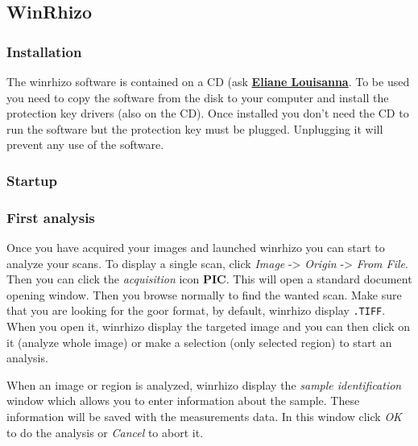 \documentclass[
  12pt,
  american,
  a4paper,
  extrafontsizes,onecolumn,openright
  ]{memoir}
\begin{document}
\normalsize

\hypertarget{winrhizo}{%
\subsection{WinRhizo}\label{winrhizo}}

\hypertarget{installation}{%
\subsubsection{Installation}\label{installation}}

The winrhizo software is contained on a CD (ask \href{https://docs.google.com/spreadsheets/d/1EqjCVr6w7fykUJtLOVwSNBucNfFGbiYXGlRcoL-s7V8/edit\#gid=0}{\textbf{Eliane Louisanna}}.
To be used you need to copy the software from the disk to your computer and install the protection key drivers (also on the CD). Once installed you don't need the CD to run the software but the protection key must be plugged.
Unplugging it will prevent any use of the software.

\hypertarget{startup}{%
\subsubsection{Startup}\label{startup}}

\hypertarget{first-analysis}{%
\subsubsection{First analysis}\label{first-analysis}}

Once you have acquired your images and launched winrhizo you can start to analyze your scans.
To display a single scan, click \emph{Image} -\textgreater{} \emph{Origin} -\textgreater{} \emph{From File}.
Then you can click the \emph{acquisition }icon \textbf{PIC}.
This will open a standard document opening window.
Then you browse normally to find the wanted scan.
Make sure that you are looking for the goor format, by default, winrhizo display \texttt{.TIFF}.
When you open it, winrhizo display the targeted image and you can then click on it (analyze whole image) or make a selection (only selected region) to start an analysis.

When an image or region is analyzed, winrhizo display the \emph{sample identification} window which allows you to enter information about the sample.
These information will be saved with the measurements data.
In this window click \emph{OK} to do the analysis or \emph{Cancel} to abort it.
\end{document}
